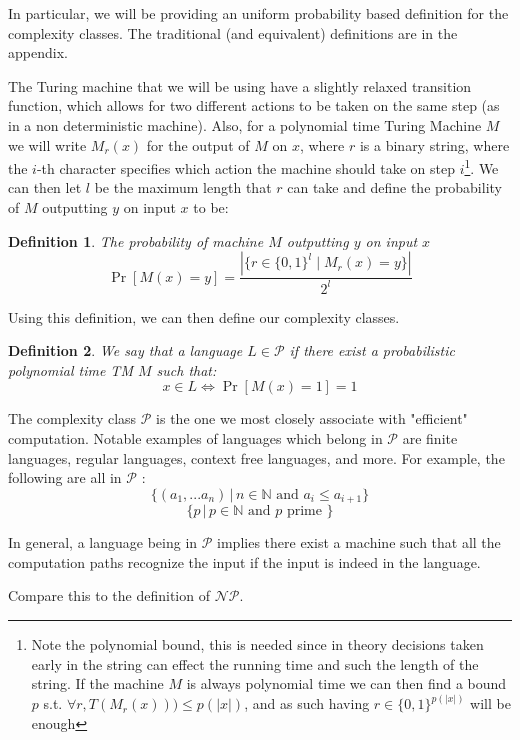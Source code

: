 \documentclass{article}
\newtheorem{definition}{Definition}
\begin{document}
In particular, we will be providing an uniform probability based definition for the complexity classes. The traditional (and equivalent) definitions are in the appendix.

The Turing machine that we will be using have a slightly relaxed transition function, which allows for two different actions to be taken on the same step (as in a non deterministic machine). Also, for a polynomial time Turing Machine $M$ we will write $M_r(x)$ for the output of $M$ on $x$, where $r$ is a binary string, where the $i$-th character specifies which action the machine should take on step $i$\footnote{Note the polynomial bound, this is needed since in theory decisions taken early in the string can effect the running time and such the length of the string. If the machine $M$ is always polynomial time we can then find a bound $p$ s.t. $\forall r, T(M_r(x))) \leq p(|x|) $, and as such having $r \in \{0,1\}^{p(|x|)}$ will be enough}. We can then let $l$ be the maximum length that $r$ can take and define the probability of $M$ outputting $y$ on input $x$ to be:

\begin{definition} The probability of machine $M$ outputting $y$ on input $x$
\[ \Pr[M(x) = y] = \frac{|\{r \in \{0, 1\}^{l} \mid M_r(x) = y \}|}{2^{l}}\]
\end{definition}

Using this definition, we can then define our complexity classes. 

\begin{definition}
We say that a language $L \in \mathcal{P}$ if there exist a probabilistic polynomial time TM $M$ such that:
\[x \in L \iff \Pr[M(x) = 1] = 1\]
\end{definition}

The complexity class $\mathcal{P}$ is the one we most closely associate with "efficient" computation. Notable examples of languages which belong in $\mathcal{P}$ are finite languages, regular languages, context free languages, and more. For example, the following are all in $\mathcal{P}$ : 
\[ \{(a_1, ... a_n) \, | \, n \in \mathbb{N} \text{ and } a_i \leq a_{i+1} \}\]
\[ \{ p \,|\, p \in \mathbb{N} \text{ and } p \text{ prime } \}\]

In general, a language being in $\mathcal{P}$ implies there exist a machine such that all the computation paths recognize the input if the input is indeed in the language. \par

Compare this to the definition of $\mathcal{NP}$.
\end{document}
